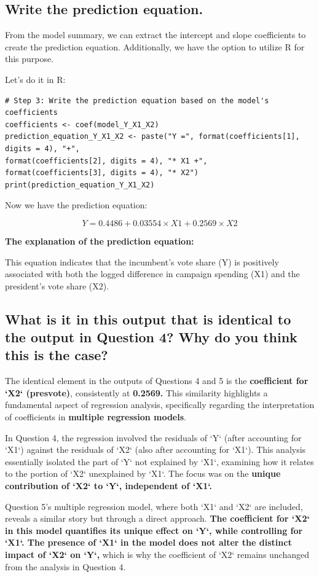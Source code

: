 \documentclass[12pt]{article}
\begin{document}
 \subsection{Write the prediction equation.}
 From the model summary, we can extract the intercept and slope coefficients to create the prediction equation. Additionally, we have the option to utilize R for this purpose.
 
 Let's do it in R:
 \begin{lstlisting}
# Step 3: Write the prediction equation based on the model's coefficients
coefficients <- coef(model_Y_X1_X2)
prediction_equation_Y_X1_X2 <- paste("Y =", format(coefficients[1], digits = 4), "+",
format(coefficients[2], digits = 4), "* X1 +",
format(coefficients[3], digits = 4), "* X2")
print(prediction_equation_Y_X1_X2)
\end{lstlisting}
Now we have the prediction equation:

\begin{equation}
Y = 0.4486 + 0.03554 \times X1 + 0.2569 \times X2
\end{equation}

\textbf{The explanation of the prediction equation:}

This equation indicates that the incumbent's vote share (Y) is positively associated with both the logged difference in campaign spending (X1) and the president's vote share (X2).
\subsection{What is it in this output that is identical to the output in Question 4? Why do you
think this is the case?}

The identical element in the outputs of Questions 4 and 5 is the\textbf{ coefficient for `X2` (presvote)}, consistently at \textbf{0.2569.} This similarity highlights a fundamental aspect of regression analysis, specifically regarding the interpretation of coefficients in \textbf{multiple regression models}.

In Question 4, the regression involved the residuals of `Y` (after accounting for `X1`) against the residuals of `X2` (also after accounting for `X1`). This analysis essentially isolated the part of `Y` not explained by `X1`, examining how it relates to the portion of `X2` unexplained by `X1`. The focus was on the \textbf{unique contribution of `X2` to `Y`, independent of `X1`.}

Question 5’s multiple regression model, where both `X1` and `X2` are included, reveals a similar story but through a direct approach. \textbf{The coefficient for `X2` in this model quantifies its unique effect on `Y`, while controlling for `X1`. The presence of `X1` in the model does not alter the distinct impact of `X2` on `Y`, }which is why the coefficient of `X2` remains unchanged from the analysis in Question 4.
\end{document}
